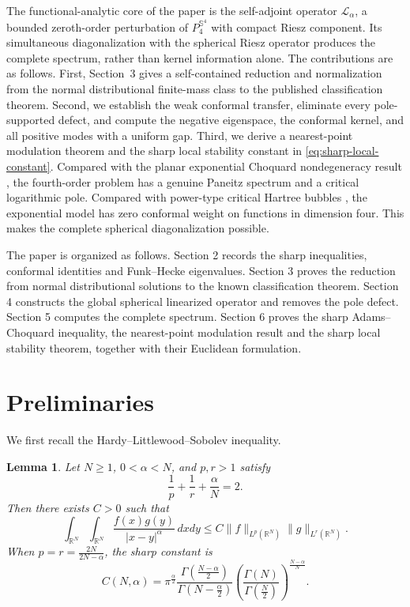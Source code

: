 \documentclass[11pt]{article}
\newtheorem{lemma}[theorem]{Lemma}
\numberwithin{equation}{section}
\begin{document}
The functional-analytic core of the paper is the self-adjoint operator
\(\mathcal L_{\alpha}\), a bounded zeroth-order perturbation of
\(P_{4}^{\mathbb S^{4}}\) with compact Riesz component. Its simultaneous
diagonalization with the spherical Riesz operator produces the complete
spectrum, rather than kernel information alone. The contributions are as
follows. First, Section~3 gives a self-contained reduction and normalization
from the normal distributional finite-mass class to the published
classification theorem. Second, we establish the weak conformal transfer,
eliminate every pole-supported defect, and compute the negative eigenspace,
the conformal kernel, and all positive modes with a uniform gap. Third, we
derive a nearest-point modulation theorem and the sharp local stability
constant in \eqref{eq:sharp-local-constant}. Compared with the planar
exponential Choquard nondegeneracy result \cite{GaoLiMa}, the fourth-order
problem has a genuine Paneitz spectrum and a critical logarithmic pole.
Compared with power-type critical Hartree bubbles
\cite{DuYang,LiLiuTangXu}, the exponential model has zero conformal weight on
functions in dimension four. This makes the complete spherical
diagonalization possible.

The paper is organized as follows. Section 2 records the sharp inequalities,
conformal identities and Funk--Hecke eigenvalues. Section 3 proves the reduction
from normal distributional solutions to the known classification theorem.
Section 4 constructs the global spherical linearized operator and removes the
pole defect. Section 5 computes the complete spectrum. Section 6 proves the
sharp Adams--Choquard inequality, the nearest-point modulation result and the
sharp local stability theorem, together with their Euclidean formulation.

\section{Preliminaries}

We first recall the Hardy--Littlewood--Sobolev inequality.

\begin{lemma}\label{lem:HLS}
Let \(N\geq1\), \(0<\alpha<N\), and \(p,r>1\) satisfy
\[
\frac1p+\frac1r+\frac{\alpha}{N}=2.
\]
Then there exists \(C>0\) such that
\[
\int_{\mathbb R^{N}}\int_{\mathbb R^{N}}
\frac{f(x)g(y)}{|x-y|^{\alpha}}\,dxdy
\leq C\|f\|_{L^{p}(\mathbb R^{N})}\|g\|_{L^{r}(\mathbb R^{N})}.
\]
When \(p=r=\frac{2N}{2N-\alpha}\), the sharp constant is
\[
C(N,\alpha)=
\pi^{\frac{\alpha}{2}}
\frac{\Gamma\left(\frac{N-\alpha}{2}\right)}
{\Gamma\left(N-\frac{\alpha}{2}\right)}
\left(
\frac{\Gamma(N)}{\Gamma\left(\frac N2\right)}
\right)^{\frac{N-\alpha}{N}}.
\]
\end{lemma}
\end{document}
